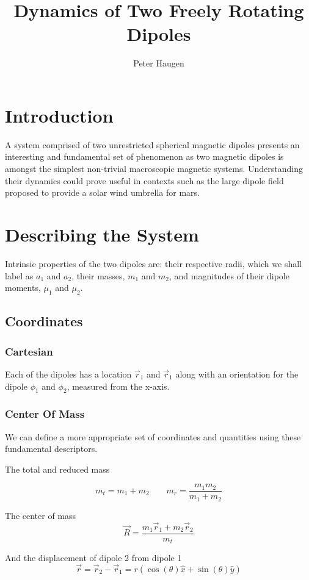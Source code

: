 \documentclass[12pt]{amsart}
\title{Dynamics of Two Freely Rotating Dipoles}
\author{Peter Haugen}
\begin{document}
\maketitle
\tableofcontents

\section{Introduction}
A system comprised of two unrestricted spherical magnetic dipoles presents an interesting and fundamental set of phenomenon as two magnetic dipoles is amongst the simplest non-trivial macroscopic magnetic systems. Understanding their dynamics could prove useful in contexts such as the large dipole field proposed to provide a solar wind umbrella for mars.

\section{Describing the System}
Intrinsic properties of the two dipoles are: their respective radii, which we shall label as $a_1$ and $a_2$, their masses, $m_1$ and $m_2$, and magnitudes of their dipole moments, $\mu_1$ and $\mu_2$.
\subsection{Coordinates}
\subsubsection{Cartesian}

Each of the dipoles has a location $\vec r_1$ and $\vec r_1$ along with an orientation for the dipole $\phi_1$ and $\phi_2$, measured from the x-axis.
\subsubsection{Center Of Mass}
We can define a more appropriate set of coordinates and quantities using these fundamental descriptors. 

The total and reduced mass

\begin{equation}
m_t = m_1+m_2
\qquad
m_r = \frac{m_1m_2}{m_1+m_2}
\end{equation}

The center of mass 
\begin{equation}
\vec R = \frac{m_1 \vec r_1+m_2 \vec r_2}{m_t}
\end{equation}

And the displacement of dipole 2 from dipole 1
\begin{equation}
\vec r 
=  \vec r_2-\vec r_1 
= r (\cos(\theta) \hat x+\sin(\theta) \hat y)
\end{equation}
\end{document}
